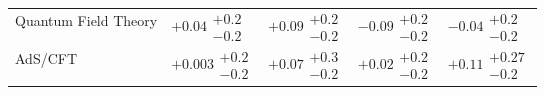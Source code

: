 \begin{table}[H]
\begin{tabular}{lllll}
Quantum Field Theory & $+0.04\substack{+0.2 \\ -0.2}$ & $+0.09\substack{+0.2 \\ -0.2}$ & $-0.09\substack{+0.2 \\ -0.2}$ & $-0.04\substack{+0.2 \\ -0.2}$ \\
AdS/CFT & $+0.003\substack{+0.2 \\ -0.2}$ & $+0.07\substack{+0.3 \\ -0.2}$ & $+0.02\substack{+0.2 \\ -0.2}$ & $+0.11\substack{+0.27 \\ -0.2}$ \\
\bottomrule
\end{tabular}\normalsize\renewcommand{\arraystretch}{1}
\end{table}
